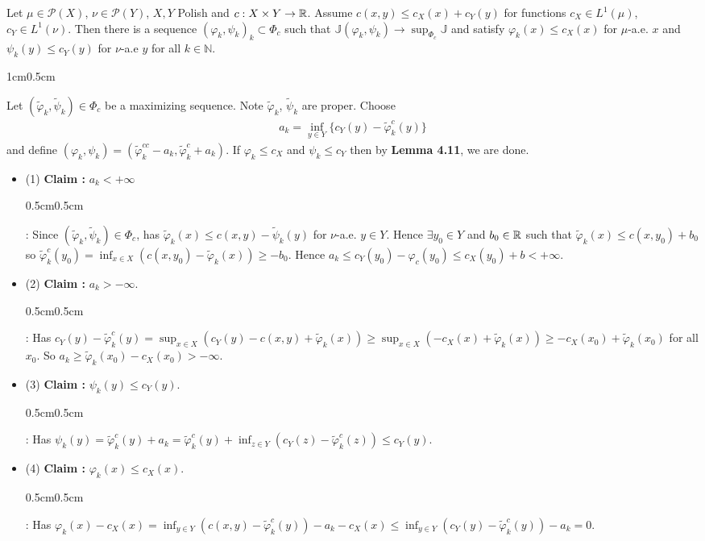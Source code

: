 \documentclass[12pt,a4paper]{article}
\newenvironment{proof}
{\begin{changemargin}{1cm}{0.5cm} 
	}%
	{\end{changemargin}
}
\newenvironment{subproof}
{\begin{changemargin}{0.5cm}{0.5cm} 
	}%
	{\end{changemargin}
}
\renewenvironment{i}
{\begin{itemize} 
	}%
	{\end{itemize}
}
\newenvironment{p}
{\begin{proof} 
	}%
	{\end{proof}
}
\begin{document}
 Let $\mu \in \mathscr{P}(X)$, $\nu\in \mathscr{P}(Y)$, $X,Y$ Polish and $c: X\times Y \rightarrow \mathbb{R}$. Assume $c(x,y) \leq c_X(x) + c_Y(y)$ for functions $c_X\in L^1(\mu) $, $c_Y\in L^1(\nu)$. Then there is a sequence $(\varphi_k, \psi_k)_k \subset \Phi_c$ such that $\mathbb{J}(\varphi_k, \psi_k) \rightarrow \sup_{\Phi_c} \mathbb{J}$ and satisfy $\varphi_k(x) \leq c_X(x)$ for $\mu$-a.e. $x$ and $\psi_k(y) \leq c_Y(y)$ for $\nu$-a.e $y$ for all $k\in \mathbb{N}$.
\begin{p}
\pf Let $(\tilde{\varphi}_k, \tilde{\psi}_k) \in \Phi_c$ be a maximizing sequence. Note $\tilde{\varphi}_k$, $\tilde{\psi}_k$ are proper. Choose
\begin{align*}
a_k = \inf_{y\in Y} \{c_Y(y) - \tilde{\varphi}^c_k (y)\}
\end{align*}
and define $(\varphi_k, \psi_k) = (\tilde{\varphi}^{cc}_k -a_k , \tilde{\varphi}^c_k + a_k)$. If $\varphi_k \leq c_X$ and $\psi_k \leq c_Y$ then by \textbf{Lemma 4.11}, we are done.
\begin{i}
\item[(1)] \textbf{Claim :} $a_k <   + \infty$
\begin{subproof}
: Since $(\tilde{\varphi}_k, \tilde{\psi}_k) \in \Phi_c$, has $\tilde{\varphi}_k(x) \leq c(x,y) - \tilde{\psi}_k(y)$ for $\nu$-a.e. $y\in Y$. Hence $\exists y_0 \in Y$ and $b_0 \in \mathbb{R}$ such that $\tilde{\varphi}_k(x)\leq c(x, y_0) + b_0$ so $\tilde{\varphi}_k^c(y_0) = \inf_{x\in X} (c(x, y_0) - \tilde{\varphi}_k(x))\geq -b_0$. Hence $a_k \leq c_Y(y_0) - \varphi_c(y_0) \leq c_X(y_0)+b< +\infty$.
\end{subproof}
\item[(2)] \textbf{Claim :} $a_k > - \infty$.
\begin{subproof}
: Has $c_Y(y) - \tilde{\varphi}^c_k(y) = \sup_{x\in X}(c_Y(y) - c(x,y) + \tilde{\varphi}_k(x)) \geq \sup_{x\in X} (-c_X(x) + \tilde{\varphi}_k(x)) \geq -c_X(x_0) + \tilde{\varphi}_k(x_0)$ for all $x_0$. So $a_k \geq \tilde{\varphi}_k(x_0) - c_X(x_0) > -\infty$.
\end{subproof}
\item[(3)] \textbf{Claim :} $\psi_k(y) \leq c_Y(y)$.
\begin{subproof}
: Has $\psi_k(y) = \tilde{\varphi}_k^c (y)+ a_k = \tilde{\varphi}^c_k(y) + \inf_{z\in Y}(c_Y(z)- \tilde{\varphi}^c_k(z)) \leq c_Y(y)$.
\end{subproof}
\item[(4)] \textbf{Claim :} $\varphi_k(x) \leq c_X(x)$.
\begin{subproof}
: Has $\varphi_k(x) - c_X(x) = \inf_{y\in Y} (c(x,y) -\tilde{\varphi}^c_k(y)) - a_k - c_X(x) \leq \inf_{y\in Y}(c_Y(y) - \tilde{\varphi}_k^c(y)) - a_k =0$.
\end{subproof} 
\end{i}
\eop
\end{p}
\s
\end{document}
